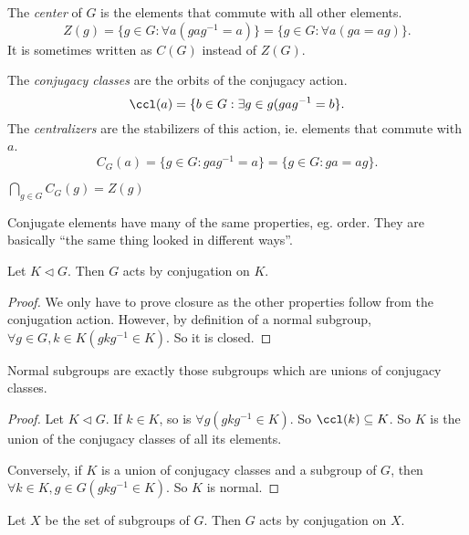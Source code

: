 \documentclass[a4paper]{article}
\begin{document}
  \begin{defi}
    The \emph{center} of $G$ is the elements that commute with all other elements.
    \[
      Z(g) = \{g\in G: \forall a(gag^{-1} = a)\} = \{g\in G: \forall a(ga = ag)\}.
    \]
    It is sometimes written as $C(G)$ instead of $Z(G)$.
  \end{defi}

  \begin{defi}
    The \emph{conjugacy classes} are the orbits of the conjugacy action.
    \[
      \ccl(a) = \{b\in G: \exists g\in g(gag^{-1} = b\}.
    \]
    The \emph{centralizers} are the stabilizers of this action, ie. elements that commute with $a$.
    \[
      C_G(a) = \{g\in G: gag^{-1} = a\} = \{g\in G: ga = ag\}.
    \]
  \end{defi}

  \note $\bigcap_{g\in G} C_G(g) = Z(g)$

  \note Conjugate elements have many of the same properties, eg. order. They are basically ``the same thing looked in different ways''.

  \begin{lemma}
    Let $K\lhd G$. Then $G$ acts by conjugation on $K$.
  \end{lemma}

  \begin{proof}
    We only have to prove closure as the other properties follow from the conjugation action. However, by definition of a normal subgroup, $\forall g\in G, k\in K(gkg^{-1}\in K)$.  So it is closed.
  \end{proof}

  \begin{prop}
    Normal subgroups are exactly those subgroups which are unions of conjugacy classes.
  \end{prop}

  \begin{proof}
    Let $K\lhd G$. If $k\in K$, so is $\forall g(gkg^{-1}\in K)$. So $\ccl(k)\subseteq K$. So $K$ is the union of the conjugacy classes of all its elements.

    Conversely, if $K$ is a union of conjugacy classes and a subgroup of $G$, then $\forall k\in K, g\in G(gkg^{-1}\in K)$. So $K$ is normal.
  \end{proof}

  \begin{lemma}
    Let $X$ be the set of subgroups of $G$. Then $G$ acts by conjugation on $X$. 
  \end{lemma}
\end{document}
